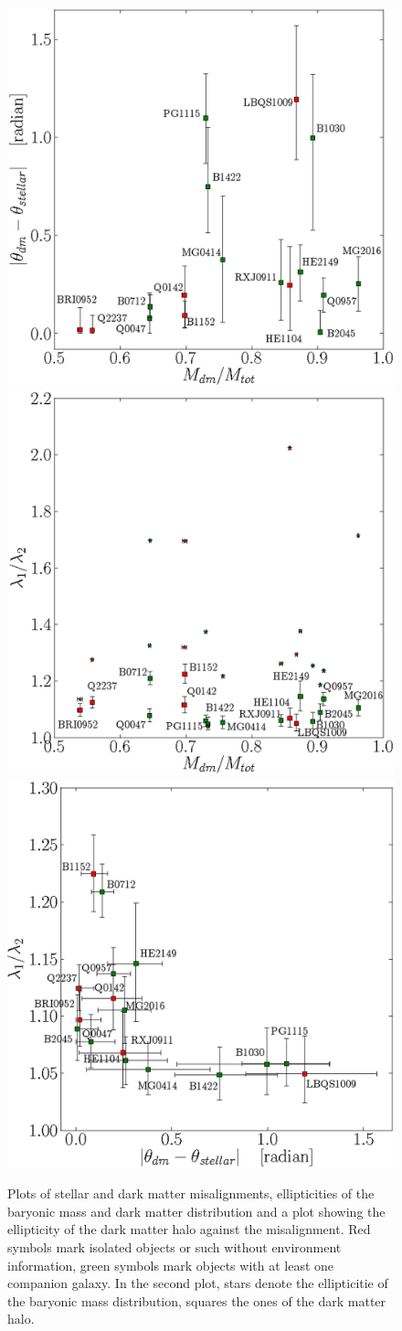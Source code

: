 \documentclass[useAMS,usenatbib]{mn2e}
\begin{document}
\begin{figure}
 \begin{center}
 \includegraphics[height=0.49\textwidth]{Figures/b.eps}
 \includegraphics[height=0.49\textwidth]{Figures/d.eps}
 \includegraphics[height=0.49\textwidth]{Figures/e.eps}\\
 \caption{Plots of stellar and dark matter misalignments, ellipticities of the baryonic mass and dark matter distribution and a plot showing the ellipticity of the dark matter halo against the misalignment. Red symbols mark isolated objects or such without environment information, green symbols mark objects with at least one companion galaxy. In the second plot, stars denote the ellipticitie of the baryonic mass distribution, squares the ones of the dark matter halo.}
 \label{fig:moneyplots}
 \end{center}
\end{figure}
\end{document}
